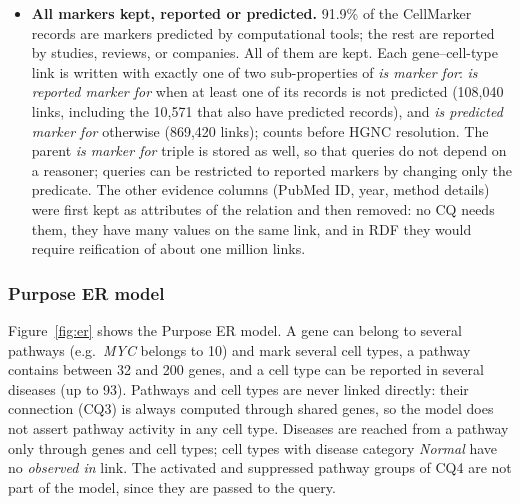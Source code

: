 \begin{itemize}
    \item \textbf{All markers kept, reported or predicted.} 91.9\% of the CellMarker records are markers predicted by computational tools; the rest are reported by studies, reviews, or companies. All of them are kept. Each gene--cell-type link is written with exactly one of two sub-properties of \emph{is marker for}: \emph{is reported marker for} when at least one of its records is not predicted (108,040 links, including the 10,571 that also have predicted records), and \emph{is predicted marker for} otherwise (869,420 links); counts before HGNC resolution. The parent \emph{is marker for} triple is stored as well, so that queries do not depend on a reasoner; queries can be restricted to reported markers by changing only the predicate. The other evidence columns (PubMed ID, year, method details) were first kept as attributes of the relation and then removed: no CQ needs them, they have many values on the same link, and in RDF they would require reification of about one million links.
\end{itemize}

\subsubsection{Purpose ER model}

Figure~\ref{fig:er} shows the Purpose ER model. A gene can belong to several pathways (e.g.\ \emph{MYC} belongs to 10) and mark several cell types, a pathway contains between 32 and 200 genes, and a cell type can be reported in several diseases (up to 93). Pathways and cell types are never linked directly: their connection (CQ3) is always computed through shared genes, so the model does not assert pathway activity in any cell type. Diseases are reached from a pathway only through genes and cell types; cell types with disease category \emph{Normal} have no \emph{observed in} link. The activated and suppressed pathway groups of CQ4 are not part of the model, since they are passed to the query.

